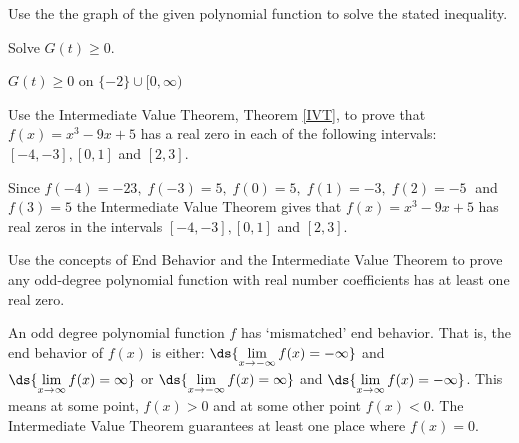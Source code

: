 \documentclass{ximera}
\begin{document}
\begin{problem}\label{polyineqfromgraphlast} 
Use the the graph of the given polynomial function to  solve the stated inequality.


Solve $G(t) \geq 0$. 

\begin{solution}
    $G(t) \geq 0$ on $\{-2\} \cup [0, \infty)$
\end{solution}
\end{problem}

\begin{problem}
Use the Intermediate Value Theorem, Theorem \ref{IVT}, to prove that $f(x) = x^{3} - 9x + 5$ has a real zero in each of the following intervals: $[-4, -3], [0, 1]$ and $[2, 3]$.  

\begin{solution}
     Since $f(-4)=-23,\; f(-3)=5,\; f(0)=5,\; f(1)=-3,\; f(2)=-5\;$ and $f(3)=5$ the Intermediate Value Theorem gives that $f(x) = x^{3} - 9x + 5$ has real zeros in the intervals $[-4, -3], [0, 1]$ and $[2, 3]$. 
\end{solution}
\end{problem}

\begin{problem}
Use the concepts of End Behavior and the Intermediate Value Theorem to prove any odd-degree polynomial function with real number coefficients has at least one real zero.

\begin{solution}
     An odd degree polynomial  function $f$ has `mismatched' end behavior.  That is, the end behavior of $f(x)$ is either:  $\ds{\lim_{x \rightarrow -\infty} f(x) = -\infty}$  and  $\ds{\lim_{x \rightarrow \infty} f(x) = \infty}$  or $\ds{\lim_{x \rightarrow -\infty} f(x) = \infty}$  and  $\ds{\lim_{x \rightarrow \infty} f(x) = -\infty}$.  This means at some point, $f(x) > 0$ and at some other point $f(x) < 0$.  The Intermediate Value Theorem guarantees at least one place where $f(x) = 0$.
\end{solution}
\end{problem}
\end{document}
